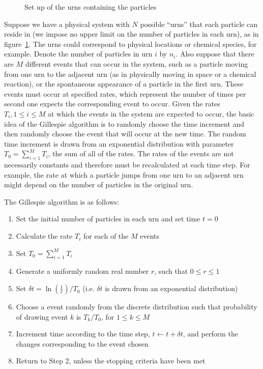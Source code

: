 \begin{figure}[ht!]
    \centering
    {
    }
    \caption{\label{fig:urns}Set up of the urns containing the particles}
\end{figure}

Suppose we have a physical system with \(N\) possible ``urns'' that each
particle can reside in (we impose no upper limit on the number of particles in
each urn), as in figure~\ref{fig:urns}. The urns could correspond to physical
locations or chemical species, for example. Denote the number of particles in
urn \(i\) by \(n_i\). Also suppose that there are \(M\) different events that
can occur in the system, such as a particle moving from one urn to the adjacent
urn (as in physically moving in space or a chemical reaction), or the
spontaneous appearance of a particle in the first urn. These events must occur
at specified rates, which represent the number of times per second one expects
the corresponding event to occur.  Given the rates \(T_i, 1 \le i \le M\) at
which the events in the system are expected to occur, the basic idea of the
Gillespie algorithm is to randomly choose the time increment and then randomly
choose the event that will occur at the new time. The random time increment is
drawn from an exponential distribution with parameter \(T_0 = \sum_{i=1}^M
T_i\), the sum of all of the rates. The rates of the events are not necessarily
constants and therefore must be recalculated at each time step. For example, the
rate at which a particle jumps from one urn to an adjacent urn might depend on
the number of particles in the original urn.

The Gillespie algorithm is as follows:
\begin{enumerate}
    \item Set the initial number of particles in each urn and set time \(t=0\)
    \item Calculate the rate \(T_i\) for each of the \(M\) events
    \item Set \(T_0 = \sum_{i=1}^M T_i\)
    \item Generate a uniformly random real number \(r\), such that \(0 \le r \le 1\)
    \item Set \(\delta t = \ln\left(\frac{1}{r}\right)/T_0\) (i.e. \(\delta t\)
        is drawn from an exponential distribution)
    \item Choose a event randomly from the discrete distribution such that
        probability of drawing event \(k\) is \(T_k/T_0\), for \(1 \le k \le
        M\)
    \item Increment time according to the time step, \(t \leftarrow t + \delta
        t\), and perform the changes corresponding to the event chosen
    \item Return to Step 2, unless the stopping criteria have been met
\end{enumerate}

